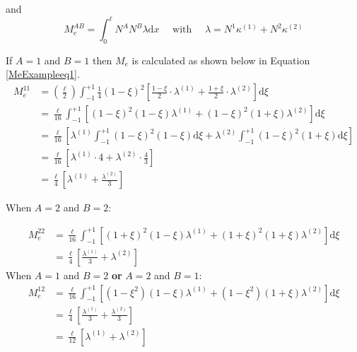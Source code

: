and
\begin{equation}
M_e^{AB} = \int_0^\ell N^A N^B \lambda \text{d}x \quad\text{ with }\quad \lambda = N^1 \kappa^{(1)} + N^2 \kappa^{(2)}
\end{equation}

If $A=1$ and $B=1$ then $M_e$ is calculated as shown below in Equation \ref{MeExampleeq1}.
\begin{equation} \label{MeExampleeq1}
\begin{aligned}
M_e^{11} &= \left(\frac{\ell}{2}\right) \int_{-1}^{+1} \frac{1}{4} (1-\xi)^2\left[ \frac{1-\xi}{2} \cdot \lambda^{(1)} + \frac{1+\xi}{2} \cdot \lambda^{(2)} \right] \text{d} \xi \\
&= \frac{\ell}{16} \int_{-1}^{+1} \left[
	(1-\xi)^2(1-\xi) \lambda^{(1)}
	+ (1-\xi)^2(1+\xi) \lambda^{(2)}
\right] \text{d}\xi \\
&= \frac{\ell}{16} \left[
	\lambda^{(1)} \int_{-1}^{+1} (1-\xi)^2(1-\xi) \text{d}\xi
	+ \lambda^{(2)} \int_{-1}^{+1} (1-\xi)^2(1+\xi) \text{d}\xi
\right] \\
&= \frac{\ell}{16} \left[
	\lambda^{(1)} \cdot 4
	+ \lambda^{(2)} \cdot \frac{4}{3}
\right] \\
&= \frac{\ell}{4} \left[
	\lambda^{(1)} + \frac{\lambda^{(2)}}{3}
\right]
\end{aligned}
\end{equation}
 
 When $A=2$ and $B=2$:

\begin{equation}\label{MeExampleeq2}
\begin{aligned}
M_e^{22} &= \frac{\ell}{16} \int_{-1}^{+1} \left[
	(1+\xi)^2(1-\xi)\lambda^{(1)} + (1+\xi)^2(1+\xi)\lambda^{(2)}
\right] \text{d}\xi \\
&= \frac{\ell}{4} \left[
	\frac{\lambda^{(1)}}{3}
	+ \lambda^{(2)}
\right]
\end{aligned}
\end{equation}
 When $A=1$ and $B=2$ \textbf{or} $A=2$ and $B=1$:
\begin{equation}\label{MeExampleeq3}
\begin{aligned}
M_e^{12} &= \frac{\ell}{16} \int_{-1}^{+1} \left[
	(1-\xi^2)(1-\xi) \lambda^{(1)}
	+ (1-\xi^2)(1+\xi)\lambda^{(2)}
\right] \text{d} \xi \\
&= \frac{\ell}{4}\left[
	\frac{\lambda^{(1)}}{3}
	+ \frac{\lambda^{(2)}}{3}
\right] \\
&= \frac{\ell}{12}\left[
	\lambda^{(1)}
	+ \lambda^{(2)}
\right] \\
\end{aligned}
\end{equation}

